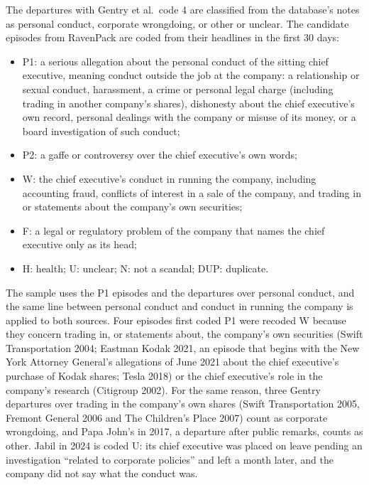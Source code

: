\documentclass[11pt,a4paper]{article}
\begin{document}
\noindent The departures with Gentry et al.\ code 4 are classified from the database's notes as personal conduct, corporate wrongdoing, or other or unclear. The candidate episodes from RavenPack are coded from their headlines in the first 30 days:
\begin{itemize}\itemsep0pt
\item P1: a serious allegation about the personal conduct of the sitting chief executive, meaning conduct outside the job at the company: a relationship or sexual conduct, harassment, a crime or personal legal charge (including trading in another company's shares), dishonesty about the chief executive's own record, personal dealings with the company or misuse of its money, or a board investigation of such conduct;
\item P2: a gaffe or controversy over the chief executive's own words;
\item W: the chief executive's conduct in running the company, including accounting fraud, conflicts of interest in a sale of the company, and trading in or statements about the company's own securities;
\item F: a legal or regulatory problem of the company that names the chief executive only as its head;
\item H: health; U: unclear; N: not a scandal; DUP: duplicate.
\end{itemize}
The sample uses the P1 episodes and the departures over personal conduct, and the same line between personal conduct and conduct in running the company is applied to both sources. Four episodes first coded P1 were recoded W because they concern trading in, or statements about, the company's own securities (Swift Transportation 2004; Eastman Kodak 2021, an episode that begins with the New York Attorney General's allegations of June 2021 about the chief executive's purchase of Kodak shares; Tesla 2018) or the chief executive's role in the company's research (Citigroup 2002). For the same reason, three Gentry departures over trading in the company's own shares (Swift Transportation 2005, Fremont General 2006 and The Children's Place 2007) count as corporate wrongdoing, and Papa John's in 2017, a departure after public remarks, counts as other. Jabil in 2024 is coded U: its chief executive was placed on leave pending an investigation ``related to corporate policies'' and left a month later, and the company did not say what the conduct was.
\end{document}
